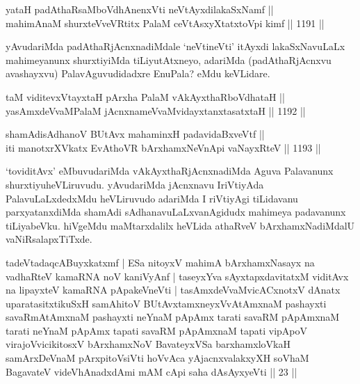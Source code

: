 
\begin{shl}
yataH padAthaRsaMboVdhAnenxVti neVtAyxdilakaSxNamf || \\
mahimAnaM shurxteVveVRtitx PalaM ceVtAsxyXtatxtoV\s pi kimf \hfill || 1191 ||  
\end{shl}

\begin{artha}
yAvudariMda padAthaRjAcnxnadiMdale `neVtineVti' itAyxdi lakaSxNavuLaLx mahimeyanunx shurxtiyiMda tiLiyutAtxneyo, adariMda (padAthaRjAcnxvu avashayxvu) PalavAguvudidadxre EnuPala? eMdu keVLidare.
\end{artha}

\begin{shl}
taM viditevxVtayxtaH pArxha PalaM vAkAyxthaRboVdhataH || \\
yasAmxdeVvaMPalaM jAcnxnameVvaMvidayxtanxtasatxtaH \hfill || 1192 ||  
\end{shl}
				
\begin{shl}
shamAdisAdhanoV BUtAvx mahaminxH padavidaBxveVtf ||  \\
iti manotxrXVkatx EvAthoVR bArxhamxNeVnApi vaNayxRteV \hfill || 1193 ||  
\end{shl}


\begin{artha}
`toviditAvx' eMbuvudariMda vAkAyxthaRjAcnxnadiMda Aguva Palavanunx shurxtiyuheVLiruvudu. yAvudariMda jAcnxnavu IriVtiyAda PalavuLaLxdedxMdu heVLiruvudo adariMda I riVtiyAgi tiLidavanu parxyatanxdiMda shamAdi sAdhanavuLaLxvanAgidudx mahimeya padavanunx tiLiyabeVku. hiVgeMdu maMtarxdalilx heVLida athaRveV bArxhamxNadiMdalU vaNiRsalapxTiTxde.
\end{artha}


\begin {kandikeshl}
tadeVtadaqcABuyxkatxmf | ESa nitoyxV mahimA bArxhamxNasayx na vadhaRteV kamaRNA noV kaniVyAnf | taseyxYva sAyxtapxdavitatxM viditAvx na lipayxteV kamaRNA pApakeVneVti | tasAmxdeVvaMvicACxnotxV dAnatx uparatasitxtikuSxH samAhitoV BUtAvxtamxneyxVvAtAmxnaM pashayxti savaRmAtAmxnaM pashayxti neYnaM pApAmx tarati savaRM pApAmxnaM tarati neYnaM pApAmx tapati savaRM pApAmxnaM tapati vipApoV virajoV\s vicikitosxV bArxhamxNoV BavateyxVSa barxhamxloVkaH samArxDeVnaM pArxpitoV\s siVti hoVvAca yAjacnxvalakxyXH soV\s haM BagavateV videVhAnadxdAmi mAM cApi saha dAsAyxyeVti || 23 ||
\end{kandikeshl}

